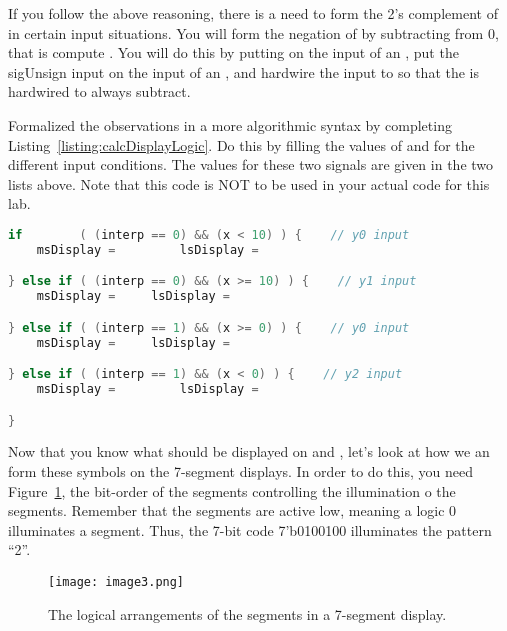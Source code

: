 If you follow the above reasoning, there is a need to form the 2's complement of  in certain input situations.  You will form the
negation of  by subtracting  from 0, that is compute .  You will do this by putting  on the  input
of an , put the sigUnsign input  on the  input of an , and hardwire the  input to  so that the
 is hardwired to always subtract.


Formalized the observations in a more algorithmic syntax by completing Listing~\ref{listing:calcDisplayLogic}.
Do this by filling the values of  and  for the different input conditions.  The 
values for these two signals are given in the two lists above.  Note that this code is NOT to be used in your 
actual code for this lab.

\pagebreak

\begin{lstlisting}[language=Verilog,
 caption={Logic that determines the output of the 4:1 muxes in Figure~\ref{fig:calcSigUnSigArch}.},
 label={listing:calcDisplayLogic},
 frame=single]
if        ( (interp == 0) && (x < 10) ) {    // y0 input
    msDisplay = 		lsDisplay = 	

} else if ( (interp == 0) && (x >= 10) ) {    // y1 input
    msDisplay =		lsDisplay =

} else if ( (interp == 1) && (x >= 0) ) {    // y0 input
    msDisplay =		lsDisplay = 

} else if ( (interp == 1) && (x < 0) ) {    // y2 input
    msDisplay = 		lsDisplay = 

}
\end{lstlisting}

Now that you know what should be displayed on   
and , let's look at how we an form these symbols on the
7-segment displays.  In order to do this, you need Figure~\ref{fig:calcSevenSeg},
the bit-order of the segments controlling the illumination o the segments. Remember
that the segments are active low, meaning a logic 0 illuminates a
segment. Thus, the 7-bit code 7'b0100100 illuminates the pattern ``2''.

\begin{figure}[ht]
\texttt{[image:  image3.png]}
\caption{The logical arrangements of the segments in a 7-segment display.}
\label{fig:calcSevenSeg}
\end{figure}


